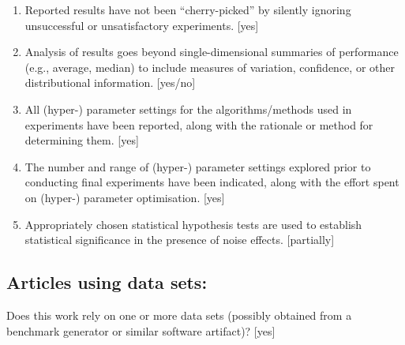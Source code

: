 \documentclass[manuscript, screen, review]{jair}
\begin{document}
\begin{enumerate}
    [yes]
    \item 
    Reported results have not been ``cherry-picked'' by silently ignoring unsuccessful or unsatisfactory experiments. 
    [yes]
    \item 
    Analysis of results goes beyond single-dimensional summaries of performance (e.g., average, median) to include measures of variation, confidence, or other distributional information. 
    [yes/no]
    \item 
    All (hyper-) parameter settings for 
    the algorithms/methods used in experiments have been reported, along with the rationale or method for determining them. 
    [yes]
    \item 
    The number and range of (hyper-) parameter settings explored prior to conducting final experiments have been indicated, along with the effort spent on (hyper-) parameter optimisation. 
    [yes]
    \item 
    Appropriately chosen statistical hypothesis tests are used to establish statistical significance
    in the presence of noise effects.
    [partially]
\end{enumerate}


\subsection*{Articles using data sets:}
Does this work rely on one or more data sets (possibly obtained from a benchmark generator or similar software artifact)? 
[yes]
\end{document}
